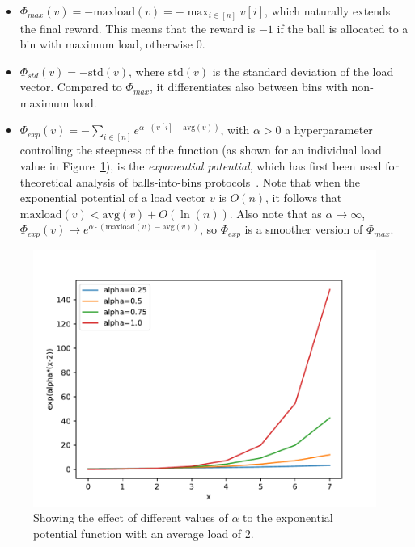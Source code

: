 \begin{itemize}
    \item
    $\Phi_{max}(v)=-\mathrm{maxload}(v)=- \max_{i \in [n]} v[i]$, which naturally extends the final reward. This means that the reward is $-1$ if the ball is allocated to a bin with maximum load, otherwise $0$.
    \item
    $\Phi_{std}(v)=-\mathrm{std}(v)$, where $\mathrm{std}(v)$ is the standard deviation of the load vector. Compared to $\Phi_{max}$, it differentiates also between bins with non-maximum load.
    \item
    $\Phi_{exp}(v)=-\sum_{i \in [n]} e^{\alpha \cdot  (v[i] - \mathrm{avg}(v))}$, with $\alpha>0$ a hyperparameter controlling the steepness of the function (as shown for an individual load value in Figure~\ref{exponential-potential-alpha}), is the \textit{exponential potential}, which has first been used for theoretical analysis of balls-into-bins protocols~\cite{ghosh1999exponentialpotential}. Note that when the exponential potential of a load vector $v$ is $O(n)$, it follows that $\mathrm{maxload}(v) < \mathrm{avg}(v)+O(\ln(n))$. Also note that as $\alpha \to \infty$, $\Phi_{exp}(v) \to e^{\alpha \cdot  (\mathrm{maxload}(v) - \mathrm{avg}(v))}$, so $\Phi_{exp}$ is a smoother version of $\Phi_{max}$.
\end{itemize}


\begin{figure}[h]
    \centering
    \includegraphics[scale=0.7]{Chapter3/Figs/exponential_potential_analysis.pdf}
    \caption{Showing the effect of different values of $\alpha$ to the exponential potential function with an average load of $2$.}
    \label{exponential-potential-alpha}
\end{figure}



